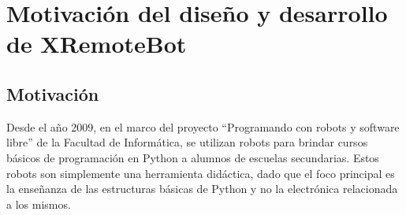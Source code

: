 \chapter{Motivación del diseño y desarrollo de XRemoteBot}\label{cha:motivacion}


\section{Motivación}\label{sec:motivacion}
Desde el año 2009, en el marco del proyecto ``Programando con robots y
software libre'' de la Facultad de Informática,
se utilizan robots para brindar cursos básicos de programación en Python a alumnos de escuelas
secundarias. Estos robots son simplemente una herramienta didáctica, dado que el foco principal es la enseñanza de las estructuras básicas de Python y no la electrónica relacionada a los mismos.



